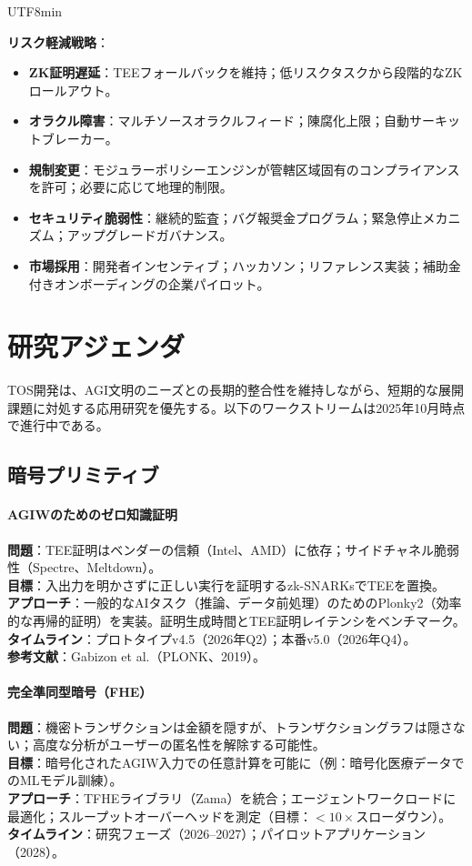 \documentclass[11pt]{article}
\begin{document}
\begin{CJK}{UTF8}{min}
\begin{itemize}[noitemsep]
\textbf{リスク軽減戦略}：
\begin{itemize}[noitemsep]
  \item \textbf{ZK証明遅延}：TEEフォールバックを維持；低リスクタスクから段階的なZKロールアウト。
  \item \textbf{オラクル障害}：マルチソースオラクルフィード；陳腐化上限；自動サーキットブレーカー。
  \item \textbf{規制変更}：モジュラーポリシーエンジンが管轄区域固有のコンプライアンスを許可；必要に応じて地理的制限。
  \item \textbf{セキュリティ脆弱性}：継続的監査；バグ報奨金プログラム；緊急停止メカニズム；アップグレードガバナンス。
  \item \textbf{市場採用}：開発者インセンティブ；ハッカソン；リファレンス実装；補助金付きオンボーディングの企業パイロット。
\end{itemize}

\section{研究アジェンダ}
\label{sec:research}

TOS開発は、AGI文明のニーズとの長期的整合性を維持しながら、短期的な展開課題に対処する応用研究を優先する。以下のワークストリームは2025年10月時点で進行中である。

\subsection{暗号プリミティブ}

\paragraph{AGIWのためのゼロ知識証明}
\textbf{問題}：TEE証明はベンダーの信頼（Intel、AMD）に依存；サイドチャネル脆弱性（Spectre、Meltdown）。\\
\textbf{目標}：入出力を明かさずに正しい実行を証明するzk-SNARKsでTEEを置換。\\
\textbf{アプローチ}：一般的なAIタスク（推論、データ前処理）のためのPlonky2（効率的な再帰的証明）を実装。証明生成時間とTEE証明レイテンシをベンチマーク。\\
\textbf{タイムライン}：プロトタイプv4.5（2026年Q2）；本番v5.0（2026年Q4）。\\
\textbf{参考文献}：Gabizon et al.（PLONK、2019）。

\paragraph{完全準同型暗号（FHE）}
\textbf{問題}：機密トランザクションは金額を隠すが、トランザクショングラフは隠さない；高度な分析がユーザーの匿名性を解除する可能性。\\
\textbf{目標}：暗号化されたAGIW入力での任意計算を可能に（例：暗号化医療データでのMLモデル訓練）。\\
\textbf{アプローチ}：TFHEライブラリ（Zama）を統合；エージェントワークロードに最適化；スループットオーバーヘッドを測定（目標：$<10\times$スローダウン）。\\
\textbf{タイムライン}：研究フェーズ（2026--2027）；パイロットアプリケーション（2028）。


\end{itemize}
\end{CJK}
\end{document}
